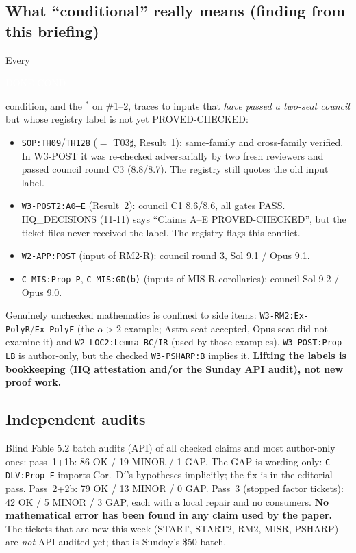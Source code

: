 \documentclass[11pt,a4paper]{article}
\newcommand{\badge}[2]{\colorbox{#1}{\textcolor{white}{\sffamily\scriptsize\bfseries\strut #2}}}
\newcommand{\DONEC}{\badge{cond}{DONE-COND}}
\newcommand{\cid}[1]{\texttt{\small #1}}
\theoremstyle{definition}
\begin{document}
\subsection{What ``conditional'' really means (finding from this briefing)}
Every \DONEC{} condition, and the $^{\ast}$ on \#1--2, traces to inputs that \emph{have passed a two-seat council} but
whose registry label is not yet PROVED-CHECKED:
\begin{itemize}
\item \cid{SOP:TH09}/\cid{TH128} ($=$ T03$\sharp$, Result~1): same-family and cross-family verified. In W3-POST it was
re-checked adversarially by two fresh reviewers and passed council round C3 (8.8/8.7). The registry still quotes
the old input label.
\item \cid{W3-POST2:A0--E} (Result~2): council C1 8.6/8.6, all gates PASS. HQ\_DECISIONS (11-11) says ``Claims A--E
PROVED-CHECKED'', but the ticket files never received the label. The registry flags this conflict.
\item \cid{W2-APP:POST} (input of RM2-R): council round 3, Sol 9.1 / Opus 9.1.
\item \cid{C-MIS:Prop-P}, \cid{C-MIS:GD(b)} (inputs of MIS-R corollaries): council Sol 9.2 / Opus 9.0.
\end{itemize}
Genuinely unchecked mathematics is confined to side items: \cid{W3-RM2:Ex-PolyR}/\cid{Ex-PolyF} (the $\alpha>2$
example; Astra seat accepted, Opus seat did not examine it) and \cid{W2-LOC2:Lemma-BC}/\cid{IR} (used by those
examples). \cid{W3-POST:Prop-LB} is author-only, but the checked \cid{W3-PSHARP:B} implies it. \textbf{Lifting the
labels is bookkeeping (HQ attestation and/or the Sunday API audit), not new proof work.}

\subsection{Independent audits}
Blind Fable 5.2 batch audits (API) of all checked claims and most author-only ones:
pass~1+1b: 86 OK / 19 MINOR / 1 GAP. The GAP is wording only: \cid{C-DLV:Prop-F} imports Cor.~D$'$'s hypotheses
implicitly; the fix is in the editorial pass. Pass~2+2b: 79 OK / 13 MINOR / 0 GAP. Pass~3 (stopped factor
tickets): 42 OK / 5 MINOR / 3 GAP, each with a local repair and no consumers. \textbf{No mathematical error has been
found in any claim used by the paper.} The tickets that are new this week (START, START2, RM2, MISR, PSHARP) are
\emph{not} API-audited yet; that is Sunday's \$50 batch.
\end{document}
